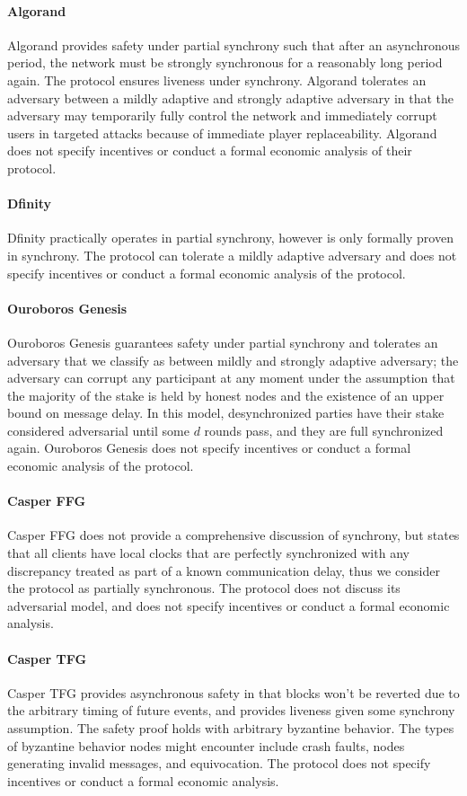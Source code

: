 \documentclass[10pt,journal,compsoc]{IEEEtran}
\begin{document}
\paragraph{Algorand} Algorand provides safety under partial synchrony such that after an asynchronous period, the network must be strongly synchronous for a reasonably long period again. The protocol ensures liveness under synchrony. Algorand tolerates an adversary between a mildly adaptive and strongly adaptive adversary in that the adversary may temporarily fully control the network and immediately corrupt users in targeted attacks because of immediate player replaceability. Algorand does not specify incentives or conduct a formal economic analysis of their protocol. 
\paragraph{Dfinity} Dfinity practically operates in partial synchrony, however is only formally proven in synchrony. The protocol can tolerate a mildly adaptive adversary and does not specify incentives or conduct a formal economic analysis of the protocol.
\paragraph{Ouroboros Genesis} Ouroboros Genesis guarantees safety under partial synchrony and tolerates an adversary that we classify as between mildly and strongly adaptive adversary; the adversary can corrupt any participant at any moment under the assumption that the majority of the stake is held by honest nodes and the existence of an upper bound on message delay. In this model, desynchronized parties have their stake considered adversarial until some $d$ rounds pass, and they are full synchronized again. Ouroboros Genesis does not specify incentives or conduct a formal economic analysis of the protocol.  
\paragraph{Casper FFG} Casper FFG does not provide a comprehensive discussion of synchrony, but states that all clients have local clocks that are perfectly synchronized with any discrepancy treated as part of a known communication delay, thus we consider the protocol as partially synchronous. The protocol does not discuss its adversarial model, and does not specify incentives or conduct a formal economic analysis. 
\paragraph{Casper TFG} Casper TFG provides asynchronous safety in that blocks won't be reverted due to the arbitrary timing of future events, and provides liveness given some synchrony assumption. The safety proof holds with arbitrary byzantine behavior. The types of byzantine behavior nodes might encounter include crash faults, nodes generating invalid messages, and equivocation. The protocol does not specify incentives or conduct a formal economic analysis. 
\end{document}
